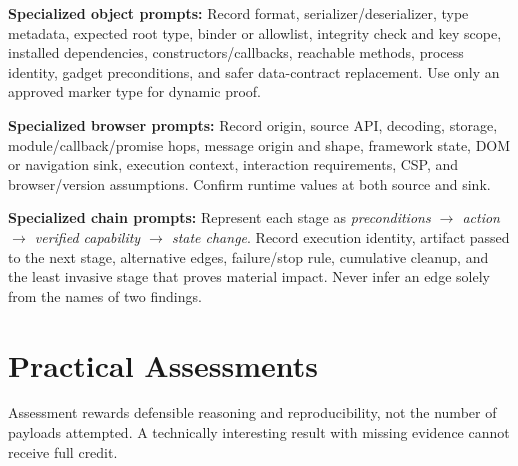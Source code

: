 \documentclass[11pt]{article}
\begin{document}
\begin{tcolorbox}[breakable,title=Template 7 --- Deserialization analysis,colback=Mist,colframe=Teal]
\analysisrecord
\textbf{Specialized object prompts:} Record format, serializer/deserializer,
type metadata, expected root type, binder or allowlist, integrity check and key
scope, installed dependencies, constructors/callbacks, reachable methods, process
identity, gadget preconditions, and safer data-contract replacement. Use only an
approved marker type for dynamic proof.
\end{tcolorbox}

\begin{tcolorbox}[breakable,title=Template 8 --- Client-side data-flow analysis,colback=Mist,colframe=Teal]
\analysisrecord
\textbf{Specialized browser prompts:} Record origin, source API, decoding,
storage, module/callback/promise hops, message origin and shape, framework state,
DOM or navigation sink, execution context, interaction requirements, CSP, and
browser/version assumptions. Confirm runtime values at both source and sink.
\end{tcolorbox}

\begin{tcolorbox}[breakable,title=Template 9 --- Exploit-chain construction,colback=Mist,colframe=Teal]
\analysisrecord
\textbf{Specialized chain prompts:} Represent each stage as
\emph{preconditions $\rightarrow$ action $\rightarrow$ verified capability
$\rightarrow$ state change}. Record execution identity, artifact passed to the
next stage, alternative edges, failure/stop rule, cumulative cleanup, and the
least invasive stage that proves material impact. Never infer an edge solely from
the names of two findings.
\end{tcolorbox}

\clearpage
\section{Practical Assessments}
\label{sec:assessments}

Assessment rewards defensible reasoning and reproducibility, not the number of
payloads attempted. A technically interesting result with missing evidence cannot
receive full credit.
\end{document}
